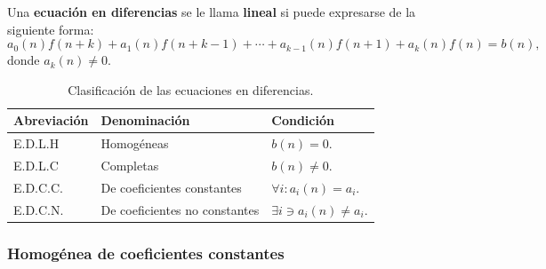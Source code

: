 \begin{frame}
\frametitle{\subsecname}

\begin{definition}
	Una \textbf{ecuación en diferencias} se le llama \textbf{lineal} si puede expresarse de la siguiente forma:
	\begin{equation}\label{eq:edl}
		a_{0}(n)f\left(n+k\right)+a_{1}(n)f\left(n+k-1\right)+\cdots+a_{k-1}(n)f\left(n+1\right)+a_{k}(n)f\left(n\right)=b\left(n\right), 
	\end{equation}
	donde $a_{k}(n)\neq0$.
\end{definition}

\begin{table}
	\caption{Clasificación de las ecuaciones en diferencias.}
	\small
	\begin{tabular}{lll}
		\toprule
		Abreviación									& Denominación									& Condición\\
		\midrule
		\rowcolor{green!40} E.D.L.H	& Homogéneas										& $b(n)=0$.\\
		E.D.L.C											& Completas											& $b(n)\neq0$.\\
		E.D.C.C.										& De coeficientes constantes		& $\forall i: a_{i}(n)=a_{i}$.\\
		E.D.C.N.										& De coeficientes no constantes	& $\exists i\ni a_{i}(n)\neq a_{i}$.\\
		\bottomrule
	\end{tabular}
\end{table}

\end{frame}

\subsubsection{Homogénea de coeficientes constantes}

